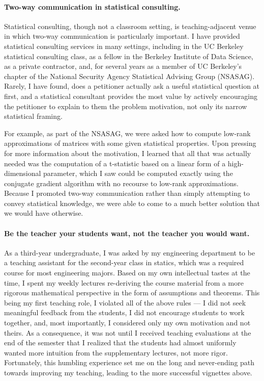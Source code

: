 \paragraph{Two-way communication in statistical consulting.}

Statistical consulting, though not a classroom setting, is teaching-adjacent
venue in which two-way communication is particularly important. I have provided
statistical consulting services in many settings, including in the UC Berkeley
statistical consulting class, as a fellow in the Berkeley Institute of Data
Science, as a private contractor, and, for several years as a member of UC
Berkeley's chapter of the National Security Agency Statistical Advising Group
(NSASAG).  Rarely, I have found, does a petitioner actually ask a useful
statistical question at first, and a statistical consultant provides the most
value by actively encouraging the petitioner to explain to them the problem
motivation, not only its narrow statistical framing.

For example, as part of the NSASAG, we were asked how to compute low-rank
approximations of matrices with some given statistical properties.  Upon
pressing for more information about the motivation, I learned that all that was
actually needed was the computation of a t-statistic based on a linear form of a
high-dimensional parameter, which I saw could be computed exactly using the
conjugate gradient algorithm with no recourse to low-rank approximations.
Because I promoted two-way communication rather than simply attempting to convey
statistical knowledge, we were able to come to a much better solution that we
would have otherwise.


\paragraph{Be the teacher your students want, not the teacher you would want.}

As a third-year undergraduate, I was asked by my engineering department to be a
teaching assistant for the second-year class in statics, which was a required
course for most engineering majors.  Based on my own intellectual tastes at the
time, I spent my weekly lectures re-deriving the course material from a more
rigorous mathematical perspective in the form of assumptions and theorems.  This
being my first teaching role, I violated all of the above rules --- I did not
seek meaningful feedback from the students, I did not encourage students to work
together, and, most importantly, I considered only my own motivation and not
theirs.  As a consequence, it was not until I received teaching evaluations at
the end of the semester that I realized that the students had almost uniformly
wanted more intuition from the supplementary lectures, not more rigor.
Fortunately, this humbling experience set me on the long  and never-ending path
towards improving my teaching, leading to the more successful vignettes above.



